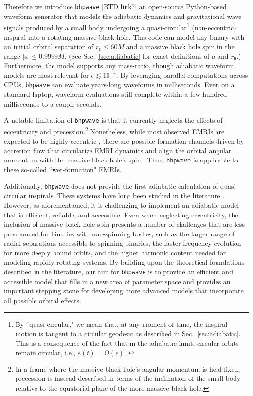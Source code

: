 \documentclass[%
 reprint,
 nofootinbib,
 amsmath,amssymb,
 aps,
 prd,
]{revtex4-2}
\begin{document}
Therefore we introduce \texttt{bhpwave} [RTD link?] an open-source Python-based waveform generator that models the adiabatic dynamics and gravitational wave signals produced by a small body undergoing a quasi-circular\footnote{By ``quasi-circular," we mean that, at any moment of time, the inspiral motion is tangent to a circular geodesic as described in Sec.~\ref{sec:adiabatic}. This is a consequence of the fact that in the adiabatic limit, circular orbits remain circular, i.e., $e(t) = O(\epsilon)$ \cite{KennOri96, Kenn98}.} (non-eccentric) inspiral into a {rotating} massive black hole. This code can model any binary with an initial orbital separation of $r_0 \leq 60 M$ and a massive black hole spin in the range $|a| \leq 0.9999 M$. (See Sec.~\ref{sec:adiabatic} for exact definitions of $a$ and $r_0$.) Furthermore, the model supports any mass-ratio, though adiabatic waveform models are most relevant for $\epsilon \lesssim 10^{-4}$. By leveraging parallel computations across CPUs, \texttt{bhpwave} can evaluate years-long waveforms in milliseconds. Even on a standard laptop, waveform evaluations still complete within a few hundred milliseconds to a couple seconds.

A notable limitation of \texttt{bhpwave} is that it currently neglects the effects of eccentricity and precession.\footnote{In a frame where the massive black hole's angular momentum is held fixed, precession is instead described in terms of the inclination of the small body relative to the equatorial plane of the more massive black hole.} Nonetheless, while most observed EMRIs are expected to be highly eccentric \cite{GairETC04},  there are possible formation channels driven by accretion flow that circularize EMRI dynamics and align the orbital angular momentum with the massive black hole's spin \cite{PanLyuYang21}. Thus, \texttt{bhpwave} is applicable to these so-called ``wet-formation" EMRIs. 

Additionally, \texttt{bhpwave} does not provide the first adiabatic calculation of quasi-circular inspirals. These systems have long been studied in the literature \cite{Detw78, KennOri96, FinnThor00, Hugh00b, GralHughWarb16}. However, as aforementioned, it is challenging to implement an adiabatic model that is efficient, reliable, and accessible. Even when neglecting eccentricity, the inclusion of massive black hole spin presents a number of challenges that are less pronounced for binaries with non-spinning bodies, such as the larger range of radial separations accessible to spinning binaries, the faster frequency evolution for more deeply bound orbits, and the higher harmonic content needed for modeling rapidly-rotating systems. By building upon the theoretical foundations described in the literature, our aim for \texttt{bhpwave} is to provide an efficient and accessible model that fills in a new area of parameter space and provides an important stepping stone for developing more advanced models that incorporate all possible orbital effects.
\end{document}
